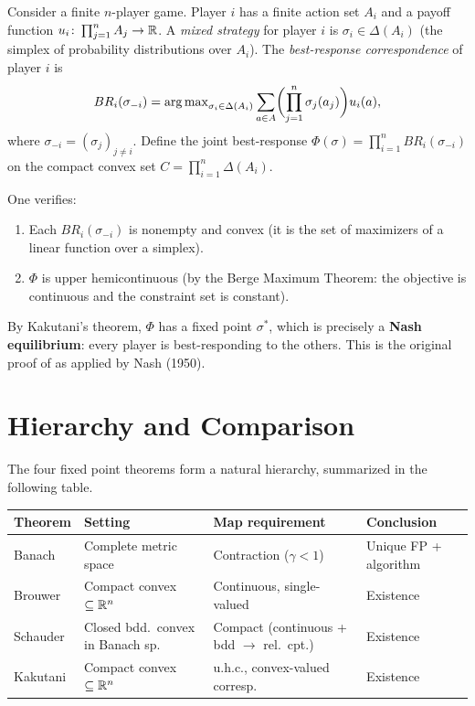 \documentclass[11pt,a4paper]{article}
\begin{document}
\begin{rlconnection}[title={Nash Equilibrium Existence via Kakutani}]
Consider a finite $n$-player game.  Player $i$ has a finite action
set $A_i$ and a payoff function $u_i \colon \prod_{j=1}^n A_j \to \mathbb{R}$.
A \emph{mixed strategy} for player $i$ is $\sigma_i \in \Delta(A_i)$
(the simplex of probability distributions over $A_i$).  The
\emph{best-response correspondence} of player $i$ is
\[
    BR_i(\sigma_{-i})
    = \operatorname{arg\,max}_{\sigma_i \in \Delta(A_i)}
    \sum_{a \in A} \biggl(\prod_{j=1}^n \sigma_j(a_j)\biggr) u_i(a),
\]
where $\sigma_{-i} = (\sigma_j)_{j \neq i}$.  Define the joint
best-response $\Phi(\sigma) = \prod_{i=1}^n BR_i(\sigma_{-i})$ on the
compact convex set $C = \prod_{i=1}^n \Delta(A_i)$.

One verifies:
\begin{enumerate}[leftmargin=2em,nosep]
    \item Each $BR_i(\sigma_{-i})$ is nonempty and convex (it is the
          set of maximizers of a linear function over a simplex).
    \item $\Phi$ is upper hemicontinuous (by the Berge Maximum
          Theorem: the objective is continuous and the constraint set
          is constant).
\end{enumerate}

By Kakutani's theorem, $\Phi$ has a fixed point $\sigma^*$, which
is precisely a \textbf{Nash equilibrium}: every player is
best-responding to the others.  This is the original proof of
\citet{kakutani1941} as applied by Nash (1950).
\end{rlconnection}


\section{Hierarchy and Comparison}
\label{sec:hierarchy}

The four fixed point theorems form a natural hierarchy, summarized in
the following table.

\begin{center}
\small
\begin{tabular}{llll}
\toprule
\textbf{Theorem} & \textbf{Setting} & \textbf{Map requirement}
    & \textbf{Conclusion} \\
\midrule
Banach & Complete metric space
    & Contraction ($\gamma < 1$)
    & Unique FP + algorithm \\
Brouwer & Compact convex $\subseteq \mathbb{R}^n$
    & Continuous, single-valued
    & Existence \\
Schauder & Closed bdd.\ convex in Banach sp.
    & Compact (continuous + bdd $\to$ rel.\ cpt.)
    & Existence \\
Kakutani & Compact convex $\subseteq \mathbb{R}^n$
    & u.h.c., convex-valued corresp.
    & Existence \\
\bottomrule
\end{tabular}
\end{center}
\end{document}
